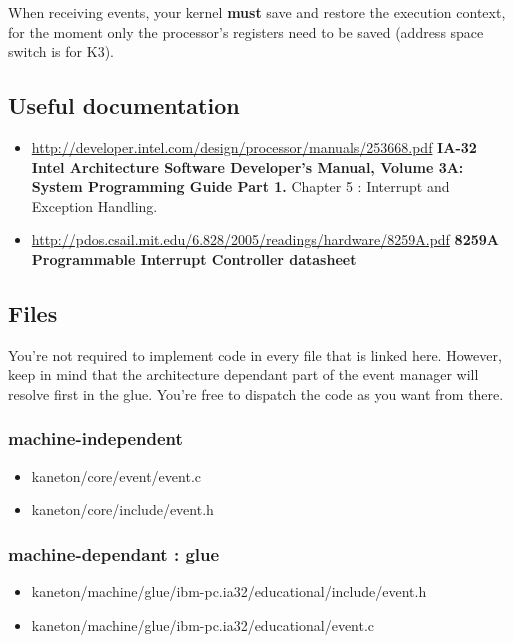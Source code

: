 When receiving events, your kernel \textbf{must} save and restore
the execution context, for the moment only the processor's
registers need to be saved (address space switch is for K3).

\subsection*{Useful documentation}

\begin{itemize}
  \item \url{http://developer.intel.com/design/processor/manuals/253668.pdf}
	    {\textbf{IA-32 Intel Architecture Software Developer's Manual,
	    Volume 3A: System Programming Guide Part 1.}}
	    Chapter 5 : Interrupt and Exception Handling.
  \item \url{http://pdos.csail.mit.edu/6.828/2005/readings/hardware/8259A.pdf}
	    {\textbf{8259A Programmable Interrupt Controller datasheet}}
\end{itemize}

\newpage
\subsection*{Files}
You're not required to implement code in every file that is linked here. However, keep in mind that the architecture dependant part of the event manager will resolve first in the glue. You're free to dispatch the code as you want from there.

\subsubsection{\color{filerefcolor} machine-independent}
\begin{itemize}
\item kaneton/core/event/event.c
\item kaneton/core/include/event.h
\end{itemize}

\subsubsection{\color{filerefcolor} machine-dependant : glue}
\begin{itemize}
\item kaneton/machine/glue/ibm-pc.ia32/educational/include/event.h
\item kaneton/machine/glue/ibm-pc.ia32/educational/event.c
\end{itemize}

